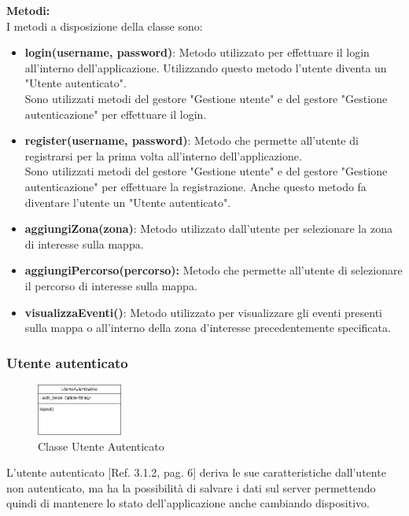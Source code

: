 \documentclass{article}
\begin{document}
\clearpage

\textbf{Metodi:}\\

I metodi a disposizione della classe sono:
\begin{itemize}
    \item \textbf{login(username, password)}: Metodo utilizzato per effettuare il login all'interno dell'applicazione. Utilizzando questo metodo l'utente diventa un "Utente autenticato".\\Sono utilizzati metodi del gestore "Gestione utente" e del gestore "Gestione autenticazione" per effettuare il login.
    \item \textbf{register(username, password)}: Metodo che permette all'utente di registrarsi per la prima volta all'interno dell'applicazione.\\Sono utilizzati metodi del gestore "Gestione utente" e del gestore "Gestione autenticazione" per effettuare la registrazione. Anche questo metodo fa diventare l'utente un "Utente autenticato".
    \item \textbf{aggiungiZona(zona)}: Metodo utilizzato dall'utente per selezionare la zona di interesse sulla mappa.\\
    \item \textbf{aggiungiPercorso(percorso):} Metodo che permette all'utente di selezionare il percorso di interesse sulla mappa.
    \item \textbf{visualizzaEventi()}: Metodo utilizzato per visualizzare gli eventi presenti sulla mappa o all'interno della zona d'interesse precedentemente specificata.
\end{itemize} 

\subsubsection{Utente autenticato}

\begin{figure}[htbp]
    \centering
    \includegraphics[width=0.25\textwidth]{Images/utenteAut_class.png}
    \caption{Classe Utente Autenticato}
    \label{fig:utente_autenticato}
\end{figure}

L'utente autenticato [Ref. 3.1.2, pag. 6] deriva le sue caratteristiche dall'utente non autenticato, ma ha la possibilità di salvare i dati sul server permettendo quindi di mantenere lo stato dell'applicazione anche cambiando dispositivo.\\
\end{document}

